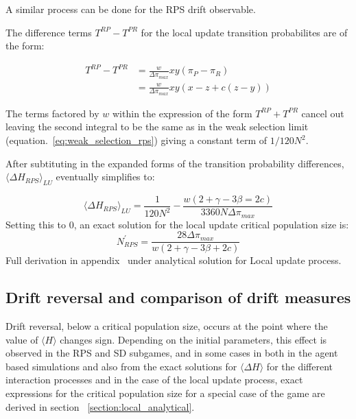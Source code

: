 \documentclass[%
 reprint,
 amsmath,amssymb,
 aps,
]{revtex4-2}
\begin{document}
A similar process can be done for the RPS drift observable.

The difference terms $T^{RP} - T^{PR}$ for the local update transition probabilites are of the form:

\begin{align}
T^{RP} - T^{PR} &= \frac{w}{\Delta \pi_{max}}xy(\pi_P - \pi_R)\nonumber \\
&=  \frac{w}{\Delta \pi_{max}}xy(x - z + c(z - y))
\end{align}

The terms factored by $w$ within the expression of the form $T^{RP} + T^{PR}$ cancel out leaving the second integral to be 
the same as in the weak selection limit (equation.~\ref{eq:weak_selection_rps}) giving a constant term 
of $1/120N^2$.



After subtituting in the expanded forms of the transition probability differences, $\langle \Delta H_{RPS} \rangle_{LU}$
eventually simplifies to:

\begin{equation}
\langle \Delta H_{RPS} \rangle_{LU} = \frac{1}{120N^2} 
- \frac{w(2 + \gamma - 3\beta = 2c)}{3360N\Delta \pi_{max}}
\end{equation}
Setting this to 0, an exact solution for the local update critical 
population size is:
\begin{equation}
N^\prime_{RPS} = \frac{28\Delta \pi_{max}}{w(2 + \gamma -3\beta + 2c)}
\end{equation}
Full derivation in appendix~\cite{project_appendix} under analytical solution for Local update process.


\subsection{Drift reversal and comparison of drift measures}



Drift reversal, below a critical
population size, occurs at the point where the 
value of $\langle H \rangle$ changes sign.
Depending on the initial parameters, 
this effect is observed in the RPS and SD subgames, and in some cases
in both in the agent based simulations and also from the 
exact solutions for $\langle \Delta H \rangle$ for the different 
interaction processes and in the case of the local update process, 
exact expressions for the critical population size for a special case 
of the game are derived in section ~\ref{section:local_analytical}.
\end{document}
